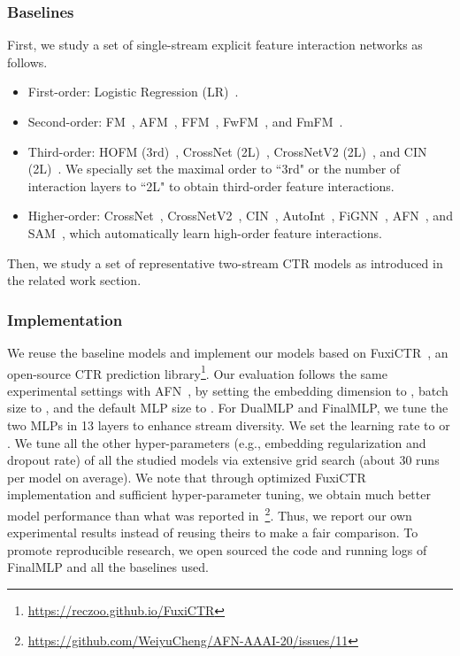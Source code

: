 \documentclass[letterpaper]{article} \usepackage{aaai23}  \usepackage{times}  \usepackage{helvet}  \usepackage{courier}  \usepackage[hyphens]{url}  \usepackage{graphicx} \urlstyle{rm} \def\UrlFont{\rm}  \usepackage{natbib}  \usepackage{caption} \frenchspacing  \setlength{\pdfpagewidth}{8.5in}  \setlength{\pdfpageheight}{11in}  \usepackage{algorithm}
\begin{document}
\subsubsection{Baselines} 
First, we study a set of single-stream explicit feature interaction networks as follows.
\begin{itemize}
    \item First-order: Logistic Regression (LR)~\cite{LR}.
    \item Second-order: FM~\cite{FM}, AFM~\cite{AFM}, FFM~\cite{FFM}, FwFM~\cite{FwFM}, and FmFM~\cite{FmFM}.
    \item Third-order: HOFM (3rd)~\cite{HighFM}, CrossNet (2L)~\cite{DCN}, CrossNetV2 (2L)~\cite{DCN_V2}, and CIN (2L)~\cite{xDeepFM}. We specially set the maximal order to ``3rd" or the number of interaction layers to ``2L" to obtain third-order feature interactions.
    \item Higher-order: CrossNet~\cite{DCN}, CrossNetV2~\cite{DCN_V2}, CIN~\cite{xDeepFM}, AutoInt~\cite{autoint}, FiGNN~\cite{FiGNN}, AFN~\cite{AFN}, and SAM~\cite{SAM}, which automatically learn high-order feature interactions. 
\end{itemize}


Then, we study a set of representative two-stream CTR models as introduced in the related work section.




\subsubsection{Implementation}
We reuse the baseline models and implement our models based on FuxiCTR~\cite{fuxictr}, an open-source CTR prediction library\footnote{\url{https://reczoo.github.io/FuxiCTR}}. Our evaluation follows the same experimental settings with AFN~\cite{AFN}, by setting the embedding dimension to , batch size to , and the default MLP size to . For DualMLP and FinalMLP, we tune the two MLPs in 13 layers to enhance stream diversity. We set the learning rate to  or . We tune all the other hyper-parameters (e.g., embedding regularization and dropout rate) of all the studied models via extensive grid search (about 30 runs per model on average). We note that through optimized FuxiCTR implementation and sufficient hyper-parameter tuning, we obtain much better model performance than what was reported in~\cite{AFN}\footnote{\url{https://github.com/WeiyuCheng/AFN-AAAI-20/issues/11}}. Thus, we report our own experimental results instead of reusing theirs to make a fair comparison. To promote reproducible research, we open sourced the code and running logs of FinalMLP and all the baselines used.
\end{document}
